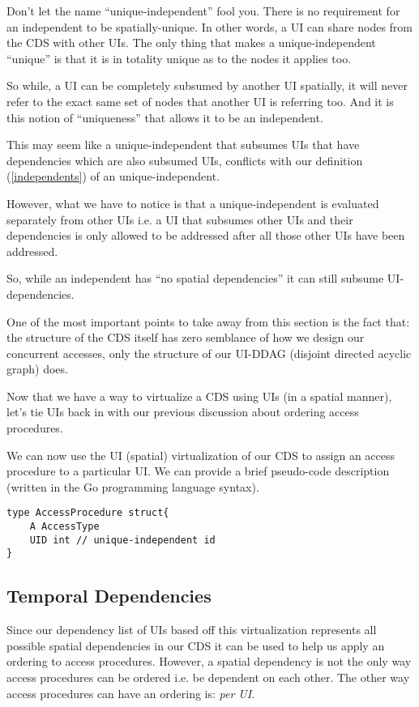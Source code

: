 Don't let the name ``unique-independent'' fool you. There is no requirement for an independent to be spatially-unique. In other words, a UI can share nodes from the CDS with other UIs. The only thing that makes a unique-independent ``unique'' is that it is in totality unique as to the nodes it applies too. 

So while, a UI can be completely subsumed by another UI spatially, it will never refer to the exact same set of nodes that another UI is referring too. And it is this notion of ``uniqueness'' that allows it to be an independent.

This may seem like a unique-independent that subsumes UIs that have dependencies which are also subsumed UIs, conflicts with our definition (\ref{independents}) of an unique-independent.

However, what we have to notice is that a unique-independent is evaluated separately from other UIs i.e. a UI that subsumes other UIs and their dependencies is only allowed to be addressed after all those other UIs have been addressed.

So, while an independent has ``no spatial dependencies'' it can still subsume UI-dependencies. 

One of the most important points to take away from this section is the fact that: the structure of the CDS itself has zero semblance of how we design our concurrent accesses, only the structure of our UI-DDAG (disjoint directed acyclic graph) does.

Now that we have a way to virtualize a CDS using UIs (in a spatial manner), let's tie UIs back in with our previous discussion about ordering access procedures.

We can now use the UI (spatial) virtualization of our CDS to assign an access procedure to a particular UI. We can provide a brief pseudo-code description (written in the Go programming language syntax).

\begin{verbatim}
type AccessProcedure struct{
	A AccessType
	UID int // unique-independent id
}
\end{verbatim}

\subsection{Temporal Dependencies}

Since our dependency list of UIs based off this virtualization represents all possible spatial dependencies in our CDS it can be used to help us apply an ordering to access procedures. However, a spatial dependency is not the only way access procedures can be ordered i.e. be dependent on each other. The other way access procedures can have an ordering is: \textit{per UI}.

